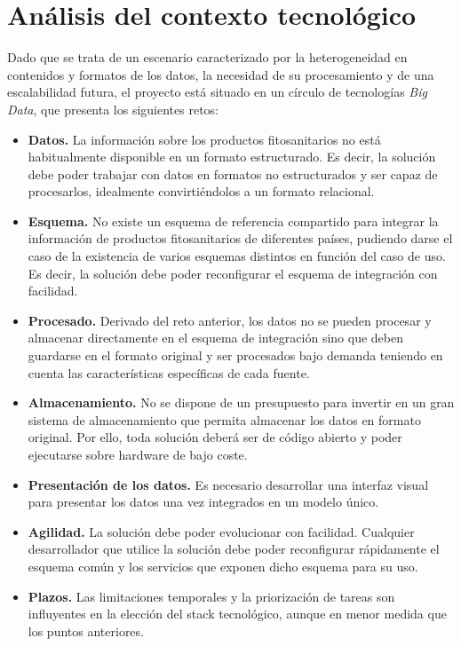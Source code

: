 \section{Análisis del contexto tecnológico}  \label{analisis.contexto}
Dado que se trata de un escenario caracterizado por la heterogeneidad en contenidos y formatos de los datos, la necesidad de su procesamiento y de una escalabilidad futura, el proyecto está situado en un círculo de tecnologías \textit{Big Data}, que presenta los siguientes retos:
\begin{itemize}
\item \textbf{Datos.} La información sobre los productos fitosanitarios no está habitualmente disponible en un formato estructurado. Es decir, la solución debe poder trabajar con datos en formatos no estructurados y ser capaz de procesarlos, idealmente convirtiéndolos a un formato relacional.
\item \textbf{Esquema.} No existe un esquema de referencia compartido para integrar la información de productos fitosanitarios de diferentes países, pudiendo darse el caso de la existencia de varios esquemas distintos en función del caso de uso. Es decir, la solución debe poder reconfigurar el esquema de integración con facilidad.
\item \textbf{Procesado.} Derivado del reto anterior, los datos no se pueden procesar y almacenar directamente en el esquema de integración sino que  deben guardarse en el formato original y ser procesados bajo demanda teniendo en cuenta las características específicas de cada fuente.
\item \textbf{Almacenamiento.} No se dispone de un presupuesto para invertir en un gran sistema de almacenamiento que permita almacenar los datos en formato original. Por ello, toda solución deberá ser de código abierto y poder ejecutarse sobre hardware de bajo coste.
\item \textbf{Presentación de los datos.} Es necesario desarrollar una interfaz visual para presentar los datos una vez integrados en un modelo único. 
\item  \textbf{Agilidad.} La solución debe poder evolucionar con facilidad. Cualquier desarrollador que utilice la solución debe poder reconfigurar rápidamente el esquema común y los servicios que exponen dicho esquema para su uso.
\item \textbf{Plazos.} Las limitaciones temporales y la priorización de tareas son influyentes en la elección del stack tecnológico, aunque en menor medida que los puntos anteriores. 
\end{itemize}


